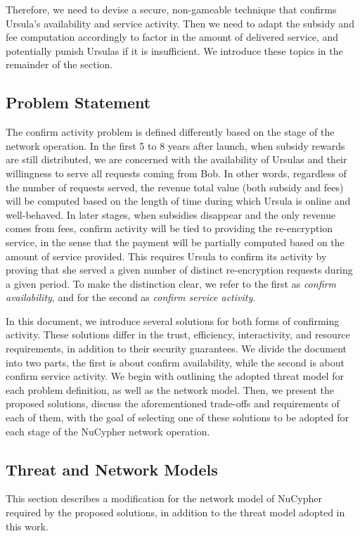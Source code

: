 Therefore, we need to devise a secure, non-gameable technique that confirms Ursula's availability and service activity. Then we need to adapt the subsidy and fee computation accordingly to factor in the amount of delivered service, and potentially punish Ursulas if it is insufficient. We introduce these topics in the remainder of the section. 


\subsection{Problem Statement}
The confirm activity problem is defined differently based on the stage of the network operation. In the first 5 to 8 years after launch, when subsidy rewards are 
still distributed, we are concerned with the availability of Ursulas and their willingness to 
serve all requests coming from Bob. In other words, regardless of the number of requests served, the revenue total value (both subsidy and fees) will be computed based on the length of time during which Ursula 
is online and well-behaved. In later stages, when subsidies disappear 
and the only revenue comes from fees, confirm activity will be tied to providing the re-encryption 
service, in the sense that the payment will be partially computed based on the amount of 
service provided. This requires Ursula to confirm its activity by proving that she served 
a given number of distinct re-encryption requests during a given period. To make the distinction 
clear, we refer to the first as \emph{confirm availability}, and for the second as \emph{confirm 
service activity}.


In this document, we introduce several solutions for both forms of confirming activity. 
These solutions differ in the trust, efficiency, interactivity, and resource 
requirements, in addition to their security guarantees. We divide the document into 
two parts, the first is about confirm availability, while the second is about confirm 
service activity. We begin with outlining the adopted threat model for each problem 
definition, as well as the network model. Then, we present the proposed solutions, discuss the aforementioned
trade-offs and requirements of each of them, with the goal of selecting one of these 
solutions to be adopted for each stage of the NuCypher network operation.


\subsection{Threat and Network Models}
\label{threat-network-model}
This section describes a modification for the network model of NuCypher 
required by the proposed solutions, in 
addition to the threat model adopted in this work.


